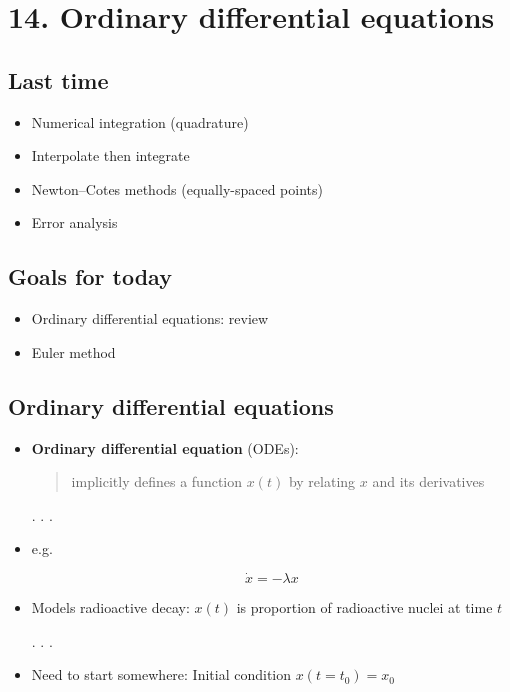 \documentclass[
]{article}
\date{}
\begin{document}
\hypertarget{ordinary-differential-equations}{%
\section{14. Ordinary differential
equations}\label{ordinary-differential-equations}}

\hypertarget{last-time}{%
\subsection{Last time}\label{last-time}}

\begin{itemize}
\item
  Numerical integration (quadrature)
\item
  Interpolate then integrate
\item
  Newton--Cotes methods (equally-spaced points)
\item
  Error analysis
\end{itemize}

\hypertarget{goals-for-today}{%
\subsection{Goals for today}\label{goals-for-today}}

\begin{itemize}
\item
  Ordinary differential equations: review
\item
  Euler method
\end{itemize}

\hypertarget{ordinary-differential-equations-1}{%
\subsection{Ordinary differential
equations}\label{ordinary-differential-equations-1}}

\begin{itemize}
\item
  \textbf{Ordinary differential equation} (ODEs):

  \begin{quote}
  implicitly defines a function \(x(t)\) by relating \(x\) and its
  derivatives
  \end{quote}

  . . .
\item
  e.g.

  \[\dot{x} = -\lambda x\]
\item
  Models radioactive decay: \(x(t)\) is proportion of radioactive nuclei
  at time \(t\)

  . . .
\item
  Need to start somewhere: Initial condition \(x(t=t_0) = x_0\)
\end{itemize}
\end{document}
